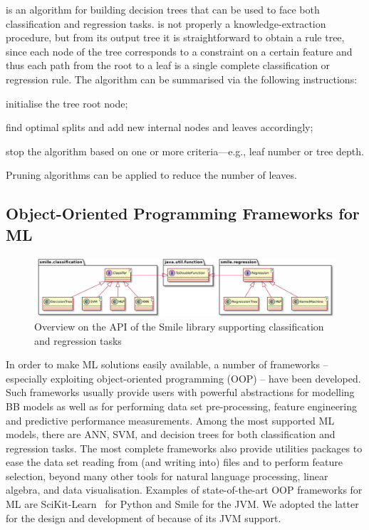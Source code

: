 \documentclass[12pt,a4paper,openright,twoside]{book}
\begin{document}
\cart{} \cite{breiman1984classification} is an algorithm for building decision trees that can be used to face both classification and regression tasks.
%
\cart{} is not properly a knowledge-extraction procedure, but from its output tree it is straightforward to obtain a rule tree, since each node of the \cart{} tree corresponds to a constraint on a certain feature and thus each path from the root to a leaf is a single complete classification or regression rule.
%
The algorithm can be summarised via the following instructions:
%
\begin{inlinelist}
    \item initialise the tree root node;
    \item find optimal splits and add new internal nodes and leaves accordingly;
    \item stop the algorithm based on one or more criteria---e.g., leaf number or tree depth.
\end{inlinelist}
%
Pruning algorithms can be applied to reduce the number of leaves.

\subsection{Object-Oriented Programming Frameworks for ML}\label{ssec:smile}

\begin{figure}
    \includegraphics[width=\linewidth]{figures/smile-simple.pdf}
    \caption{Overview on the API of the Smile library supporting classification and regression tasks}
    \label{fig:smile}
\end{figure}

In order to make ML solutions easily available, a number of frameworks -- especially exploiting object-oriented programming (OOP) -- have been developed.
%
Such frameworks usually provide users with powerful abstractions for modelling BB models as well as for performing data set pre-processing, feature engineering and predictive performance measurements.
%
Among the most supported ML models, there are ANN, SVM, and decision trees for both classification and regression tasks.
%
The most complete frameworks also provide utilities packages to ease the data set reading from (and writing into) files and to perform feature selection, beyond many other tools for natural language processing, linear algebra, and data visualisation.
%
Examples of state-of-the-art OOP frameworks for ML are SciKit-Learn~\cite{PedregosaVGMTGBPWDVPCBPD11} for Python and Smile for the JVM.
%
We adopted the latter for the design and development of \psyke{} because of its JVM support.
\end{document}
